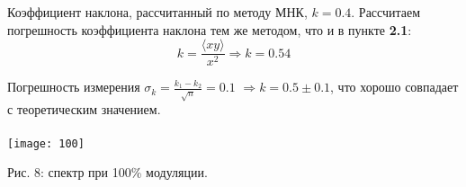 \documentclass[a4paper,12pt]{article}
\begin{document}
\ \\
\ \\
Коэффициент наклона, рассчитанный по методу МНК, $k=0.4$. Рассчитаем погрешность коэффициента наклона тем же методом, что и в пункте {{\bf 2.1}}:
$$ k = \frac{\langle xy \rangle}{x^2}  \Rightarrow k=0.54$$ 

\newpage
Погрешность измерения $\sigma_k=\frac{k_1 - k_2}{\sqrt{n}} = 0.1$
$ \Rightarrow k=0.5\pm0.1$, что хорошо совпадает с теоретическим значением.
\ \\
\ \\
\texttt{[image: 100]}
\par \hspace{4cm} Рис. 8: спектр при 100\% модуляции. 
\end{document}
